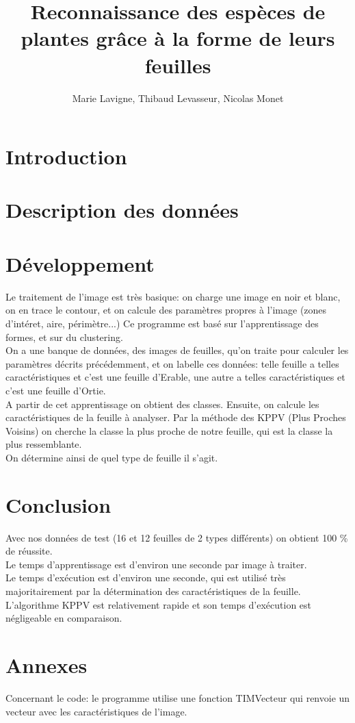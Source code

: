 \documentclass{article}
\title{Reconnaissance des espèces de plantes grâce à la forme de leurs feuilles}
\author{Marie Lavigne, Thibaud Levasseur, Nicolas Monet}
\begin{document}
\maketitle
\newpage
\tableofcontents
\newpage
\section{Introduction}

\newpage

\section{Description des données}

\section{Développement}
Le traitement de l'image est très basique: on charge une image en noir et blanc, on en trace le contour, et on calcule des paramètres propres à l'image (zones d'intéret, aire, périmètre...)
\smallbreak
Ce programme est basé sur l'apprentissage des formes, et sur du clustering. \\
On a une banque de données, des images de feuilles, qu'on traite pour calculer les paramètres décrits précédemment, et on labelle ces données: telle feuille a telles caractéristiques et c'est une feuille d'Erable, une autre a telles caractéristiques et c'est une feuille d'Ortie. \\
A partir de cet apprentissage on obtient des classes.
\smallbreak
Ensuite, on calcule les caractéristiques de la feuille à analyser. Par la méthode des KPPV (Plus Proches Voisins) on cherche la classe la plus proche de notre feuille, qui est la classe la plus ressemblante. \\
On détermine ainsi de quel type de feuille il s'agit.
\newpage
\section{Conclusion}
Avec nos données de test (16 et 12 feuilles de 2 types différents) on obtient 100 \% de réussite.\\
Le temps d'apprentissage est d'environ une seconde par image à traiter. \\
Le temps d'exécution est d'environ une seconde, qui est utilisé très majoritairement par la détermination des caractéristiques de la feuille. L'algorithme KPPV est relativement rapide et son temps d'exécution est négligeable en comparaison.
\newpage
\section{Annexes}
Concernant le code: le programme utilise une fonction TIMVecteur qui renvoie un vecteur avec les caractéristiques de l'image.
\end{document}
